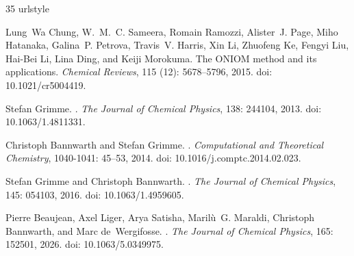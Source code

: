 \documentclass[11pt,a4paper]{article}
\begin{document}
\setlength{\bibsep}{2pt}
\begin{thebibliography}{35}
\providecommand{\natexlab}[1]{#1}
\providecommand{\url}[1]{\texttt{#1}}
\expandafter\ifx\csname urlstyle\endcsname\relax
  \providecommand{\doi}[1]{doi: #1}\else
  \providecommand{\doi}{doi: \begingroup \urlstyle{rm}\Url}\fi

Lung~Wa Chung, W.~M.~C. Sameera, Romain Ramozzi, Alister~J. Page, Miho
  Hatanaka, Galina~P. Petrova, Travis~V. Harris, Xin Li, Zhuofeng Ke, Fengyi
  Liu, Hai-Bei Li, Lina Ding, and Keiji Morokuma.
\newblock The {ONIOM} method and its applications.
\newblock \emph{Chemical Reviews}, 115 (12): 5678--5796,
  2015.
\newblock \doi{10.1021/cr5004419}.

Stefan Grimme.
.
\newblock \emph{The Journal of Chemical Physics}, 138: 244104, 2013.
\newblock \doi{10.1063/1.4811331}.

Christoph Bannwarth and Stefan Grimme.
.
\newblock \emph{Computational and Theoretical Chemistry}, 1040-1041:
  45--53, 2014.
\newblock \doi{10.1016/j.comptc.2014.02.023}.

Stefan Grimme and Christoph Bannwarth.
.
\newblock \emph{The Journal of Chemical Physics}, 145: 054103, 2016.
\newblock \doi{10.1063/1.4959605}.

Pierre Beaujean, Axel Liger, Arya Satisha, Marilù~G. Maraldi, Christoph
  Bannwarth, and Marc de~Wergifosse.
.
\newblock \emph{The Journal of Chemical Physics}, 165: 152501, 2026.
\newblock \doi{10.1063/5.0349975}.


\end{thebibliography}
\end{document}
